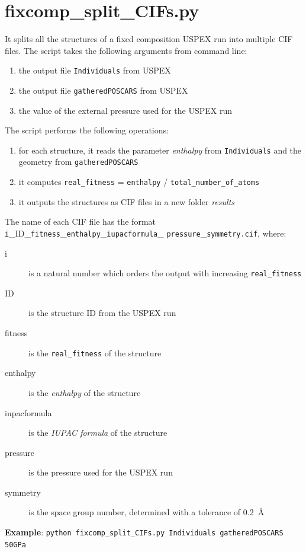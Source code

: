 \documentclass{article}
\begin{document}
\section{fixcomp\_split\_CIFs.py}
It splits all the structures of a fixed composition USPEX run into multiple CIF files. The script takes the following arguments from command line:
\begin{enumerate}
	\item the output file \texttt{Individuals} from USPEX
	\item the output file \texttt{gatheredPOSCARS} from USPEX
	\item the value of the external pressure used for the USPEX run
\end{enumerate}
The script performs the following operations:
\begin{enumerate}
	\item for each structure, it reads the parameter \emph{enthalpy} from \texttt{Individuals} and the geometry from \texttt{gatheredPOSCARS}
	\item it computes \texttt{real\_fitness} = \texttt{enthalpy} / \texttt{total\_number\_of\_atoms}
	\item it outputs the structures as CIF files in a new folder \textit{results}
\end{enumerate}
The name of each CIF file has the format \texttt{i}\_ID\_\texttt{fitness}\_\texttt{enthalpy}\_\texttt{iupacformula}\_ \texttt{pressure}\_\texttt{symmetry.cif}, where:
\begin{description}
	\item[i] is a natural number which orders the output with increasing \texttt{real\_fitness}
	\item[ID] is the structure ID from the USPEX run
	\item[fitness] is the \texttt{real\_fitness} of the structure
	\item[enthalpy] is the \emph{enthalpy} of the structure
	\item[iupacformula] is the \emph{IUPAC formula} of the structure
	\item[pressure] is the pressure used for the USPEX run
	\item[symmetry] is the space group number, determined with a tolerance of 0.2~\AA
\end{description}
\textbf{Example}: \texttt{python fixcomp\_split\_CIFs.py Individuals gatheredPOSCARS 50GPa}
\end{document}
